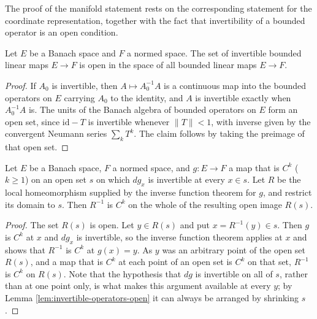 The proof of the manifold statement rests on the corresponding statement for the coordinate representation, together with the fact that invertibility of a bounded operator is an open condition.

\begin{lemma}
\label{lem:invertible-operators-open}
\leanok
Let $E$ be a Banach space and $F$ a normed space. The set of invertible bounded linear maps $E \to F$ is open in the space of all bounded linear maps $E \to F$.
\end{lemma}

\begin{proof}
\leanok
If $A_0$ is invertible, then $A \mapsto A_0^{-1} A$ is a continuous map into the bounded operators on $E$ carrying $A_0$ to the identity, and $A$ is invertible exactly when $A_0^{-1}A$ is. The units of the Banach algebra of bounded operators on $E$ form an open set, since $\mathrm{id} - T$ is invertible whenever $\|T\| < 1$, with inverse given by the convergent Neumann series $\sum_k T^k$. The claim follows by taking the preimage of that open set.
\end{proof}

\begin{lemma}
\label{lem:smooth-local-inverse-on-open}
\leanok
{}
Let $E$ be a Banach space, $F$ a normed space, and $g : E \to F$ a map that is $C^k$ ($k \geq 1$) on an open set $s$ on which $dg_x$ is invertible at every $x \in s$. Let $R$ be the local homeomorphism supplied by the inverse function theorem for $g$, and restrict its domain to $s$. Then $R^{-1}$ is $C^k$ on the whole of the resulting open image $R(s)$.
\end{lemma}

\begin{proof}
\leanok
{}
The set $R(s)$ is open. Let $y \in R(s)$ and put $x = R^{-1}(y) \in s$. Then $g$ is $C^k$ at $x$ and $dg_x$ is invertible, so the inverse function theorem applies at $x$ and shows that $R^{-1}$ is $C^k$ at $g(x) = y$. As $y$ was an arbitrary point of the open set $R(s)$, and a map that is $C^k$ at each point of an open set is $C^k$ on that set, $R^{-1}$ is $C^k$ on $R(s)$. Note that the hypothesis that $dg$ is invertible on all of $s$, rather than at one point only, is what makes this argument available at every $y$; by Lemma \ref{lem:invertible-operators-open} it can always be arranged by shrinking $s$.
\end{proof}

